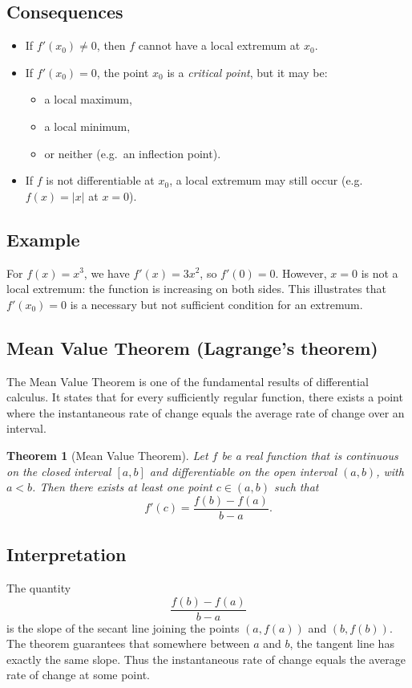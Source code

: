 \documentclass[11pt,a4paper]{article}
\theoremstyle{definition} \newtheorem{definition}{Definition} \theoremstyle{plain} \newtheorem{theorem}{Theorem}
\begin{document}
\subsection*{Consequences}
\begin{itemize}
\item If $f'(x_0)\neq 0$, then $f$ cannot have a local extremum at $x_0$.
\item If $f'(x_0)=0$, the point $x_0$ is a \emph{critical point}, but it may be:
\begin{itemize}
\item a local maximum,
\item a local minimum,
\item or neither (e.g.\ an inflection point).
\end{itemize}
\item If $f$ is not differentiable at $x_0$, a local extremum may still occur (e.g.\ $f(x)=|x|$ at $x=0$). \end{itemize}
\subsection*{Example}
For $f(x)=x^3$, we have $f'(x)=3x^2$, so $f'(0)=0$.
However, $x=0$ is not a local extremum: the function is increasing on both sides.
This illustrates that $f'(x_0)=0$ is a necessary but not sufficient condition for an extremum.
\subsection{Mean Value Theorem (Lagrange's theorem)}
The Mean Value Theorem is one of the fundamental results of differential calculus.
It states that for every sufficiently regular function, there exists a point where the instantaneous rate of change equals the average rate of change over an interval.
\begin{theorem}[Mean Value Theorem]\label{thm:mean-value} Let $f$ be a real function that is continuous on the closed interval $[a,b]$ and differentiable on the open interval $(a,b)$, with $a<b$.
Then there exists at least one point $c\in(a,b)$ such that
\[ f'(c) = \frac{f(b)-f(a)}{b-a}. \]
\end{theorem}
\subsection*{Interpretation}
The quantity
\[ \frac{f(b)-f(a)}{b-a} \]
is the slope of the secant line joining the points $(a,f(a))$ and $(b,f(b))$.
The theorem guarantees that somewhere between $a$ and $b$, the tangent line has exactly the same slope.
Thus the instantaneous rate of change equals the average rate of change at some point.
\end{document}

